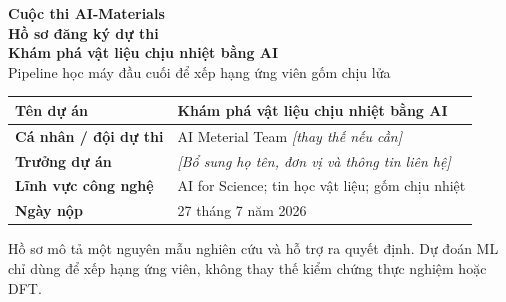 \documentclass[10pt,a4paper]{article}
\renewcommand{\arraystretch}{1.15}
\newcommand{\field}[2]{\textbf{#1} & #2\\\hline}
\begin{document}
\thispagestyle{empty}
\begin{center}
  {\Large\bfseries Cuộc thi AI-Materials\\[2mm] Hồ sơ đăng ký dự thi}\\[13mm]
  {\LARGE\bfseries Khám phá vật liệu chịu nhiệt bằng AI}\\[3mm]
  {\large Pipeline học máy đầu cuối để xếp hạng ứng viên gốm chịu lửa}
\end{center}
\vfill
\renewcommand{\arraystretch}{1.7}
\begin{tabularx}{0.82\linewidth}{>{\raggedright\arraybackslash}p{48mm}X}
\hline
\field{Tên dự án}{Khám phá vật liệu chịu nhiệt bằng AI}
\field{Cá nhân / đội dự thi}{AI Meterial Team \quad \textit{[thay thế nếu cần]}}
\field{Trưởng dự án}{\textit{[Bổ sung họ tên, đơn vị và thông tin liên hệ]}}
\field{Lĩnh vực công nghệ}{AI for Science; tin học vật liệu; gốm chịu nhiệt}
\field{Ngày nộp}{27 tháng 7 năm 2026}
\end{tabularx}
\vfill
\begin{center}\small
Hồ sơ mô tả một nguyên mẫu nghiên cứu và hỗ trợ ra quyết định.\newline
Dự đoán ML chỉ dùng để xếp hạng ứng viên, không thay thế kiểm chứng thực nghiệm hoặc DFT.
\end{center}
\newpage
\end{document}
